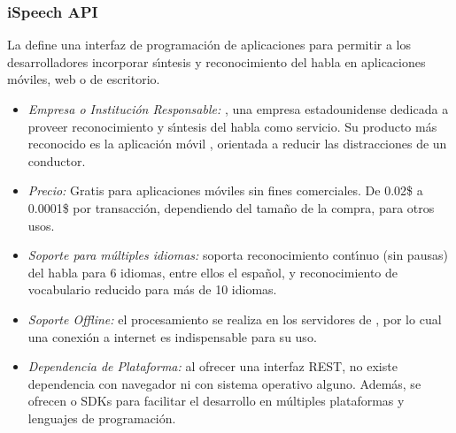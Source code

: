 \subsubsection{iSpeech API}
\label{sec:ispeech}

La  \cite{iSpeech} define una interfaz de programaci\'on de aplicaciones para permitir
a los desarrolladores incorporar s{\'\i}ntesis y reconocimiento del habla en aplicaciones m\'oviles,
web o de escritorio.

\begin{itemize}
	\item \emph{Empresa o Instituci\'on Responsable:} , una empresa estadounidense dedicada a
	proveer reconocimiento y s{\'\i}ntesis del habla como servicio. Su producto m\'as reconocido es la aplicaci\'on m\'ovil
	, orientada a reducir las distracciones de un conductor.
	\item \emph{Precio:} Gratis para aplicaciones m\'oviles sin fines comerciales. De 0.02\$ a 0.0001\$ por
	transacci\'on, dependiendo del tama\~no de la compra, para otros usos.
	\item \emph{Soporte para m\'ultiples idiomas:} soporta reconocimiento cont{\'\i}nuo (sin pausas) del habla para 6 idiomas,
	entre ellos el espa\~nol, y reconocimiento de vocabulario reducido para m\'as de 10 idiomas.
	\item \emph{Soporte Offline:} el procesamiento se realiza en los servidores de , por lo cual
	una conexi\'on a internet es indispensable para su uso.
	\item \emph{Dependencia de Plataforma:} al ofrecer una interfaz REST, no existe dependencia con navegador
	ni con sistema operativo alguno. Adem\'as, se ofrecen  o SDKs para facilitar
	el desarrollo en m\'ultiples plataformas y lenguajes de programaci\'on.
\end{itemize}